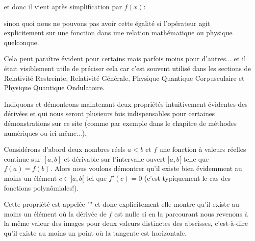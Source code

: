 	et donc il vient après simplification par $f(x)$:
	
	sinon quoi nous ne pouvons pas avoir cette égalité si l'opérateur agit explicitement sur une fonction dans une relation mathématique ou physique quelconque.

	Cela peut paraître évident pour certains mais parfois moins pour d'autres... et il était visiblement utile de préciser cela car c'est souvent utilisé dans les sections de Relativité Restreinte, Relativité Générale, Physique Quantique Corpusculaire et Physique Quantique Ondulatoire.

	Indiquons et démontrons maintenant deux propriétés intuitivement évidentes des dérivées et qui nous seront plusieurs fois indispensables pour certaines démonstrations sur ce site (comme par exemple dans le chapitre de méthodes numériques ou ici même...).

	\begin{theorem}
	Considérons d'abord deux nombres réels $a<b$ et $f$ une fonction à valeurs réelles continue sur $[a, b]$ et dérivable sur l'intervalle ouvert  $]a, b[$ telle que $f(a)=f(b)$. Alors nous voulons démontrer qu'il existe bien évidemment au moins un élément $c \in ]a, b[$ tel que $f'(c)=0$ (c'est typiquement le cas des fonctions polynômiales!).
	
	Cette propriété est appelée "\label{rolle theorem}" et donc explicitement elle montre qu'il existe au moins un élément où la dérivée de $f$ est nulle si en la parcourant nous revenons à la même valeur des images pour deux valeurs distinctes des abscisses, c'est-à-dire qu'il existe au moins un point où la tangente est horizontale.
	\end{theorem}

